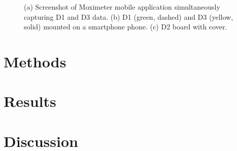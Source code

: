 \begin{figure}
	\begin{center}
	\end{center}
	\caption{(a) Screenshot of Moximeter mobile application simultaneously capturing D1 and D3 data. (b) D1 (green, dashed) and D3 (yellow, solid) mounted on a smartphone phone. (c) D2 board with cover.} 
	\label{fig:designs}
\end{figure} 


\section{Methods}
\label{chap:moxi:methods}



\section{Results}
\label{chap:moxi:results}



\section{Discussion}
\label{chap:moxi:discussion}




